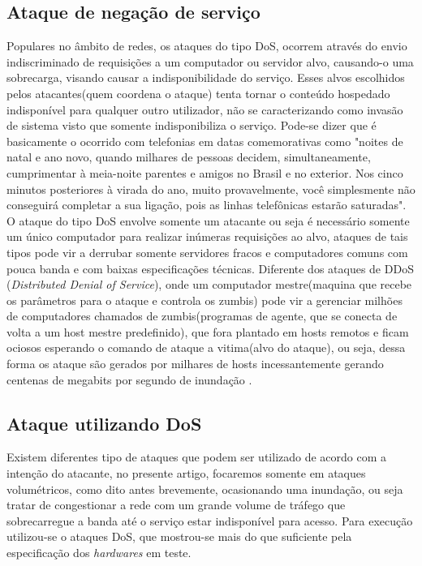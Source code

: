 \documentclass[12pt]{article}
\begin{document}
  \subsection{Ataque de negação de serviço} \label{sec:ddos}
    Populares no âmbito de redes, os ataques do tipo DoS, ocorrem através do envio indiscriminado de requisições a um computador ou servidor alvo, causando-o uma sobrecarga, visando causar a indisponibilidade do serviço. Esses alvos escolhidos pelos atacantes(quem coordena o ataque) tenta tornar o conteúdo hospedado indisponível para qualquer outro utilizador, não se caracterizando como invasão de sistema visto que somente indisponibiliza o serviço. Pode-se dizer que é basicamente o ocorrido com telefonias em datas comemorativas como "noites de natal e ano novo, quando milhares de pessoas decidem, simultaneamente, cumprimentar à meia-noite parentes e amigos no Brasil e no exterior. Nos cinco minutos posteriores à virada do ano, muito provavelmente, você simplesmente não conseguirá completar a sua ligação, pois as linhas telefônicas estarão saturadas"\cite{ddOS}.\\
    O ataque do tipo DoS envolve somente um atacante ou seja é necessário somente um único computador para realizar inúmeras requisições ao alvo, ataques de tais tipos pode vir a derrubar somente servidores fracos e computadores comuns com pouca banda e com baixas especificações técnicas. Diferente dos ataques de DDoS (\textit{Distributed Denial of Service}), onde um computador mestre(maquina que recebe os parâmetros para o ataque e controla os zumbis) pode vir a gerenciar milhões de computadores chamados de zumbis(programas de agente, que se conecta de volta a um host mestre predefinido), que fora plantado em hosts remotos e ficam ociosos esperando o comando de ataque a vitima(alvo do ataque), ou seja, dessa forma os ataque são gerados por milhares de hosts incessantemente gerando centenas de megabits por segundo de inundação \cite{ddOS2}. 
  
  \subsection{Ataque utilizando DoS} \label{sec:ataquedos}
    Existem diferentes tipo de ataques que podem ser utilizado de acordo com a intenção do atacante, no presente artigo, focaremos somente em ataques volumétricos, como dito antes brevemente, ocasionando uma inundação, ou seja tratar de congestionar a rede com um grande volume de tráfego que sobrecarregue a banda até o serviço estar indisponível para acesso. Para execução utilizou-se o ataques DoS, que mostrou-se mais do que suficiente pela especificação dos \textit{hardwares} em teste.
         
\end{document}

